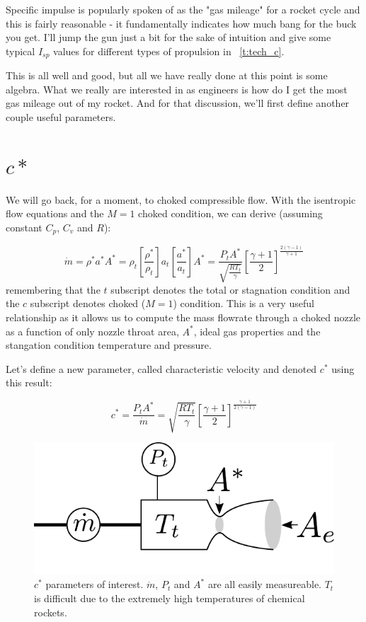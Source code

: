 \documentclass[twocolumn]{memoir} %
\begin{document}
Specific impulse is popularly spoken of as the "gas mileage" for a
rocket cycle and this is fairly reasonable - it fundamentally indicates
how much bang for the buck you get. I'll jump the gun just a bit for the
sake of intuition and give some typical $I_{sp}$ values for different
types of propulsion in ~\cref{t:tech_c}.

This is all well and good, but all we have really done at this point is
some algebra. What we really are interested in as engineers is how do I
get the most gas mileage out of my rocket. And for that discussion,
we'll first define another couple useful parameters.

\section{$c*$}\label{c}

We will go back, for a moment, to choked compressible flow. With the
isentropic flow equations and the $M=1$ choked condition, we can
derive (assuming constant $C_p$, $C_v$ and $R$):

\begin{equation}\dot{m} = \rho^* a^* A^*  = \rho_t \left[ \frac{\rho^*}{\rho_t}\right]a_t \left[ \frac{a^*}{a_t}\right]A^* = \frac{P_t A^*}{\sqrt{\frac{R T_t}{\gamma}}} \left[\frac{\gamma + 1}{2}\right]^{\frac{2(\gamma-1)}{\gamma+1}}
\end{equation}
%
remembering that the $t$ subscript denotes the total or stagnation
condition and the $c$ subscript denotes choked ($M=1$) condition.
This is a very useful relationship as it allows us to compute the mass
flowrate through a choked nozzle as a function of only nozzle throat
area, $A^*$, ideal gas properties and the stangation condition
temperature and pressure.

Let's define a new parameter, called characteristic velocity and denoted
$c^{*}$ using this result:

\begin{equation}
    c^* = \frac{P_t A^*}{\dot{m}} = \sqrt{\frac{R T_t}{\gamma}}\left[\frac{\gamma + 1}{2}\right]^{\frac{\gamma + 1}{2(\gamma - 1)}}
    \label{eq:cstar}
\end{equation}

\begin{figure}[H]
    \includegraphics[width=0.9\columnwidth]{cstar_diagram}
    \caption{$c^*$ parameters of interest.  $\dot{m}$, $P_t$ and $A^*$ are all easily 
    measureable.  $T_t$ is difficult due to the extremely high temperatures of chemical
    rockets.}
\end{figure}
\end{document}
